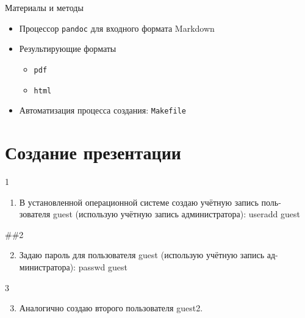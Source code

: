 \documentclass[
  ignorenonframetext,
  aspectratio=169,
]{beamer}
\providecommand{\tightlist}{%
  \setlength{\itemsep}{0pt}\setlength{\parskip}{0pt}}\usepackage{longtable,booktabs,array}
\begin{document}
\begin{frame}[fragile]{Материалы и методы}
\label{ux43cux430ux442ux435ux440ux438ux430ux43bux44b-ux438-ux43cux435ux442ux43eux434ux44b}
\begin{itemize}[<+->]
\tightlist
\item
  Процессор \texttt{pandoc} для входного формата Markdown
\item
  Результирующие форматы

  \begin{itemize}[<+->]
  \tightlist
  \item
    \texttt{pdf}
  \item
    \texttt{html}
  \end{itemize}
\item
  Автоматизация процесса создания: \texttt{Makefile}
\end{itemize}
\end{frame}

\section{Создание
презентации}\label{ux441ux43eux437ux434ux430ux43dux438ux435-ux43fux440ux435ux437ux435ux43dux442ux430ux446ux438ux438}

\begin{frame}{1}
\label{section}
\begin{enumerate}[<+->]
\tightlist
\item
  В установленной операционной системе создаю учётную запись поль-
  зователя guest (использую учётную запись администратора): useradd
  guest
\end{enumerate}

\#\#2

\begin{enumerate}[<+->]
\setcounter{enumi}{1}
\tightlist
\item
  Задаю пароль для пользователя guest (использую учётную запись ад-
  министратора): passwd guest
\end{enumerate}
\end{frame}

\begin{frame}{3}
\label{section-1}
\begin{enumerate}[<+->]
\setcounter{enumi}{2}
\tightlist
\item
  Аналогично создаю второго пользователя guest2.
\end{enumerate}
\end{frame}
\end{document}
